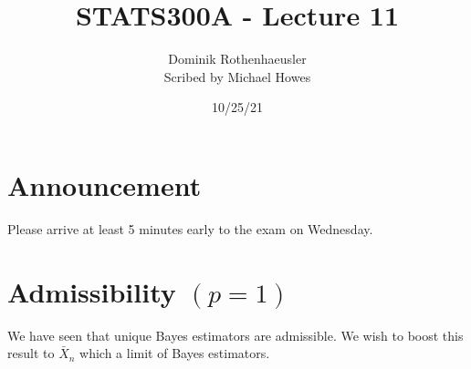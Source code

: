 




\title{STATS300A - Lecture 11}
\author{Dominik Rothenhaeusler\\ Scribed by Michael Howes}
\date{10/25/21}

\pagestyle{fancy}
\fancyhf{}


\maketitle
\tableofcontents

\section{Announcement}
Please arrive at least 5 minutes early to the exam on Wednesday.

\section{Admissibility $(p=1)$}
We have seen that unique Bayes estimators are admissible. We wish to boost this result to $\bar{X}_n$ which a limit of Bayes estimators.

